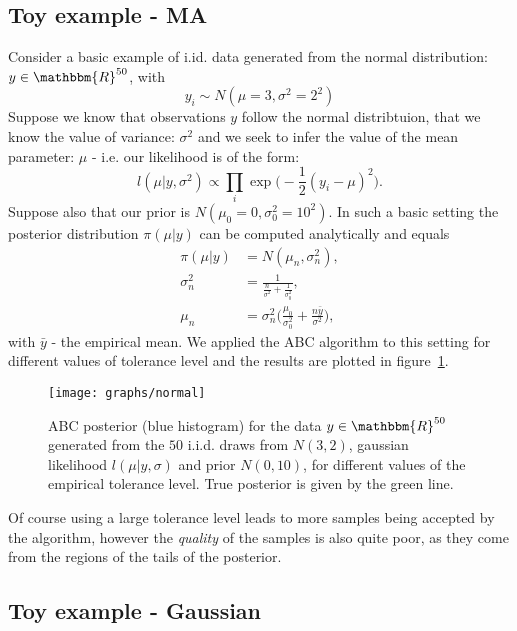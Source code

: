 \documentclass[fleqn,10pt]{SelfArx} %
\begin{document}
\subsection{Toy example - MA}
Consider a basic example of i.id. data generated from the normal distribution: $y\in\mathbbm{R}^{50}$, with
\begin{equation}
y_i\sim N(\mu = 3,\sigma^2 = 2^2)
\end{equation}
Suppose we know that observations $y$ follow the normal distribtuion, that we know the value of variance: $\sigma^2$ and we seek to infer the value of the mean parameter: $\mu$ - i.e. our likelihood is of the form:
\begin{equation}
l(\mu|y, \sigma^2) \propto \prod_i \exp\bigg( -\frac{1}{2}(y_i-\mu)^2 \bigg).
\end{equation}
Suppose also that our prior is $N(\mu_0 = 0,\sigma_0^2 = 10^2)$. In such a basic setting the posterior distribution $\pi(\mu|y)$ can be computed analytically and equals
\begin{equation}
\begin{split}
\pi(\mu|y) &= N(\mu_n,\sigma_n^2),\\
\sigma_n^2 &= \frac{1}{\frac{n}{\sigma^2}+\frac{1}{\sigma^2_0}},\\
\mu_n &= \sigma_n^2 \bigg( \frac{\mu_0}{\sigma_0^2}+ \frac{n\bar{y}}{\sigma^2}\bigg),
\end{split}
\end{equation}
with $\bar{y}$ - the empirical mean. We applied the ABC algorithm to this setting for different values of tolerance level and the results are plotted in figure~\ref{fig:normal}.
\begin{figure}[ht]\centering
\texttt{[image: graphs/normal]}
\caption{ABC posterior (blue histogram) for the data $y\in\mathbbm{R}^{50}$ generated from the $50$ i.i.d. draws from $N(3,2)$, gaussian likelihood $l(\mu|y,\sigma)$ and prior $N(0,10)$, for different values of the empirical tolerance level. True posterior is given by the green line. }
\label{fig:normal}
\end{figure}
Of course using a large tolerance level leads to more samples being accepted by the algorithm, however the \emph{quality} of the samples is also quite poor, as they come from the regions of the tails of the posterior. 


\subsection{Toy example - Gaussian}
\end{document}
